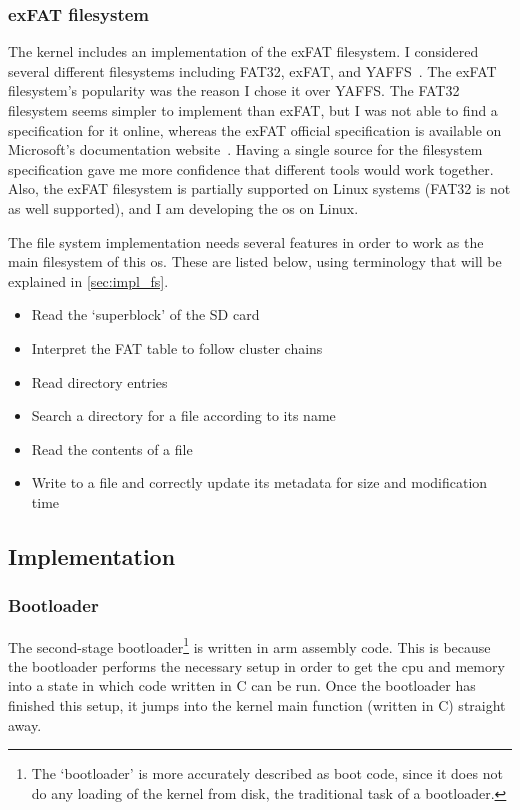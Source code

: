 \documentclass{article}
\begin{document}
\subsubsection{exFAT filesystem}
The kernel includes an implementation of the exFAT filesystem. I considered
several different filesystems including FAT32, exFAT, and
YAFFS~\cite{yaffs-fs}. The exFAT filesystem's popularity was the reason I chose
it over YAFFS. The FAT32 filesystem seems simpler to implement than exFAT, but
I was not able to find a specification for it online, whereas the exFAT
official specification is available on Microsoft's documentation
website~\cite{exFAT-specs}. Having a single source for the filesystem
specification gave me more confidence that different tools would work together.
Also, the exFAT filesystem is partially supported on Linux systems (FAT32 is
not as well supported), and I am developing the \gls{os} on Linux.

The file system implementation needs several features in order to work as
the main filesystem of this \gls{os}. These are listed below, using terminology
that will be explained in \autoref{sec:impl_fs}.

\begin{itemize}
    \item Read the `superblock' of the SD card
    \item Interpret the FAT table to follow cluster chains
    \item Read directory entries
    \item Search a directory for a file according to its name
    \item Read the contents of a file
    \item Write to a file and correctly update its metadata for size and
        modification time
\end{itemize}

\subsection{Implementation}
\subsubsection{Bootloader}
The second-stage bootloader\footnote{The `bootloader' is more accurately
described as boot code, since it does not do any loading of the kernel from
disk, the traditional task of a bootloader.} is written in \gls{arm} assembly
code. This is because the bootloader performs the necessary setup in order to
get the \gls{cpu} and memory into a state in which code written in C can be
run. Once the bootloader has finished this setup, it jumps into the kernel main
function (written in C) straight away.
\end{document}
